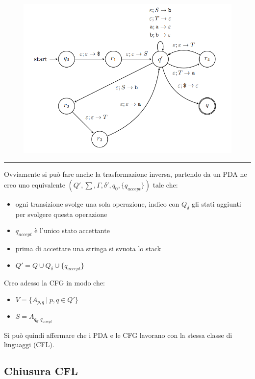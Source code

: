 \documentclass{article}
\begin{document}
\begin{figure}[ht]
    \centering
    \includegraphics[width=0.8\linewidth]{CFGtoPDA_ex.png}
    \label{fig:cfg2pda_ex}
\end{figure}

\noindent\rule{\textwidth}{0.5pt}\newline

\noindent Ovviamente si può fare anche la trasformazione inversa, partendo da un PDA ne creo uno equivalente $(Q',\sum,\Gamma,\delta',q_0,\{q_{accept}\})$ tale che:
\begin{itemize}
    \item ogni transizione svolge una sola operazione, indico con $Q_\delta$ gli stati aggiunti per svolgere questa operazione
    \item $q_{accept}$ è l'unico stato accettante
    \item prima di accettare una stringa si svuota lo stack
    \item $Q'=Q\cup Q_\delta\cup \{q_{accept}\}$\newline
\end{itemize}

\noindent Creo adesso la CFG in modo che:
\begin{itemize}
    \item $V=\{A_{p,q}\ |\ p,q\in Q'\}$
    \item $S=A_{q_0,q_{accept}}$\newline
\end{itemize}

\vspace{-5pt}

\noindent Si può quindi affermare che i PDA e le CFG lavorano con la stessa classe di linguaggi (CFL).

\subsection{Chiusura CFL}
\end{document}
